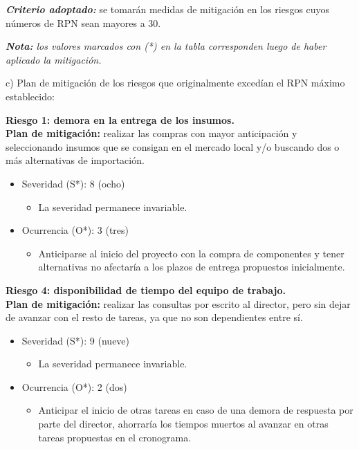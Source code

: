 \documentclass[
11pt, %
]{charter}
\begin{document}
\textit{\textbf{Criterio adoptado:}} se tomarán medidas de mitigación en los riesgos cuyos números de RPN sean mayores a 30.

\textit{\textbf{Nota:} los valores marcados con (*) en la tabla corresponden luego de haber aplicado la mitigación.}

c) Plan de mitigación de los riesgos que originalmente excedían el RPN máximo establecido:
 
\textbf{Riesgo 1: demora en la entrega de los insumos.}\\
\textbf{Plan de mitigación:} realizar las compras con mayor anticipación y seleccionando insumos que se consigan en el mercado local y/o buscando dos o más alternativas de importación.
  \begin{itemize}
	\item Severidad (S*): 8 (ocho)
        \begin{itemize}
			\item La severidad permanece invariable.
		\end{itemize}
	\item Ocurrencia (O*): 3 (tres)
        \begin{itemize}
			\item Anticiparse al inicio del proyecto con la compra de componentes y tener alternativas no afectaría a los plazos de entrega propuestos inicialmente.
		\end{itemize}
	\end{itemize}

\textbf{Riesgo 4: disponibilidad de tiempo del equipo de trabajo.}\\
\textbf{Plan de mitigación:} realizar las consultas por escrito al director, pero sin dejar de avanzar con el resto de tareas, ya que no son dependientes entre sí. 
\begin{itemize}
	\item Severidad (S*): 9 (nueve)
        \begin{itemize}
			\item La severidad permanece invariable.
		\end{itemize}
	\item Ocurrencia (O*): 2 (dos)
        \begin{itemize}
			\item Anticipar el inicio de otras tareas en caso de una demora de respuesta por parte del director, ahorraría los tiempos muertos al avanzar en otras tareas propuestas en el cronograma.
		\end{itemize}
	\end{itemize}
\end{document}
